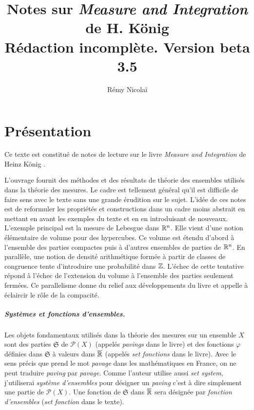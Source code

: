 
\nocite{*}

\title{
         Notes sur \emph{Measure and Integration} de H. König \\
         \large Rédaction incomplète. Version  beta 3.5
      }
\author{Rémy Nicolaï}


\maketitle
\tableofcontents
\clearpage

\chapter{Présentation}
\noindent Ce texte est constitué de notes de lecture sur le livre \emph{Measure and Integration} de Heinz König \cite{könig1997measure}.

\noindent L'ouvrage fournit des méthodes et des résultats de théorie des ensembles utilisés dans la théorie des mesures. Le cadre est tellement général qu'il est difficile de faire sens avec le texte sans une grande érudition sur le sujet. L'idée de ces notes est de reformuler les propriétés et constructions dans un cadre moins abstrait en mettant en avant les exemples du texte et en en introduisant de nouveaux.\newline
L'exemple principal est la mesure de Lebesgue dans $\mathbb{R}^n$. Elle vient d'une notion élémentaire de volume pour des hypercubes. Ce volume est étendu d'abord à l'ensemble des parties compactes puis à d'autres ensembles de parties de $\mathbb{R}^n$.\newline
En parallèle, une notion de densité arithmétique formée à partir de classes de congruence tente d'introduire une probabilité dans $\mathbb{Z}$. L'échec de cette tentative répond à l'échec de l'extension du volume à l'ensemble des parties seulement fermées. Ce parallelisme donne du relief aux développements du livre et appelle à éclaircir le rôle de la compacité.

\paragraph*{Systèmes et fonctions d'ensembles.}
Les objets fondamentaux utilisés dans la théorie des mesures sur un ensemble $X$ sont des parties $\mathfrak{S}$ de $\mathcal{P}(X)$ (appelés \emph{pavings} dans le livre) et des fonctions $\varphi$ définies dans $\mathfrak{S}$ à valeurs dans $\overline{\mathbb{R}}$ (appelés \emph{set fonctions} dans le livre).\newline
Avec le sens précis que prend le mot \emph{pavage} dans les mathématiques en France, on ne peut traduire \emph{paving} par \emph{pavage}. Comme l'auteur utilise aussi \emph{set system}, j'utiliserai \emph{système d'ensembles} pour désigner un \emph{paving} c'est à dire simplement une partie de $\mathcal{P}(X)$.\newline
Une fonction de $\mathfrak{S}$ dans $\overline{\mathbb{R}}$ sera désignée par \emph{fonction d'ensembles} (\emph{set fonction} dans le texte).


